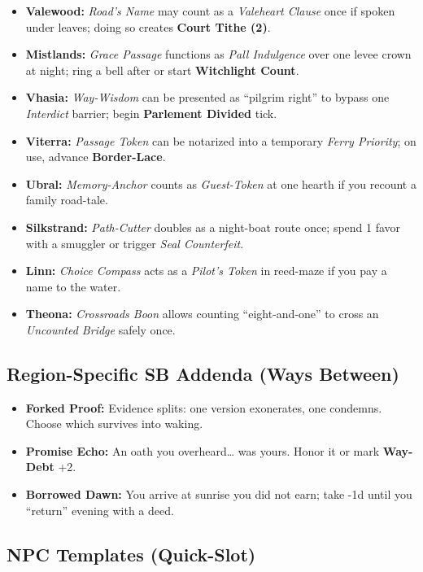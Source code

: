 \begin{itemize}
\item \textbf{Valewood:} \emph{Road's Name} may count as a \emph{Valeheart Clause} once if spoken under leaves; doing so creates \textbf{Court Tithe (2)}.
\item \textbf{Mistlands:} \emph{Grace Passage} functions as \emph{Pall Indulgence} over one levee crown at night; ring a bell after or start \textbf{Witchlight Count}.
\item \textbf{Vhasia:} \emph{Way-Wisdom} can be presented as “pilgrim right” to bypass one \emph{Interdict} barrier; begin \textbf{Parlement Divided} tick.
\item \textbf{Viterra:} \emph{Passage Token} can be notarized into a temporary \emph{Ferry Priority}; on use, advance \textbf{Border-Lace}.
\item \textbf{Ubral:} \emph{Memory-Anchor} counts as \emph{Guest-Token} at one hearth if you recount a family road-tale.
\item \textbf{Silkstrand:} \emph{Path-Cutter} doubles as a night-boat route once; spend 1 favor with a smuggler or trigger \emph{Seal Counterfeit}.
\item \textbf{Linn:} \emph{Choice Compass} acts as a \emph{Pilot’s Token} in reed-maze if you pay a name to the water.
\item \textbf{Theona:} \emph{Crossroads Boon} allows counting “eight-and-one” to cross an \emph{Uncounted Bridge} safely once.
\end{itemize}
\subsection*{Region-Specific SB Addenda (Ways Between)}

\begin{itemize}
\item \textbf{Forked Proof:} Evidence splits: one version exonerates, one condemns. Choose which survives into waking.
\item \textbf{Promise Echo:} An oath you overheard… was yours. Honor it or mark \textbf{Way-Debt} +2.
\item \textbf{Borrowed Dawn:} You arrive at sunrise you did not earn; take -1d until you “return” evening with a deed.
\end{itemize}
\subsection*{NPC Templates (Quick-Slot)}

